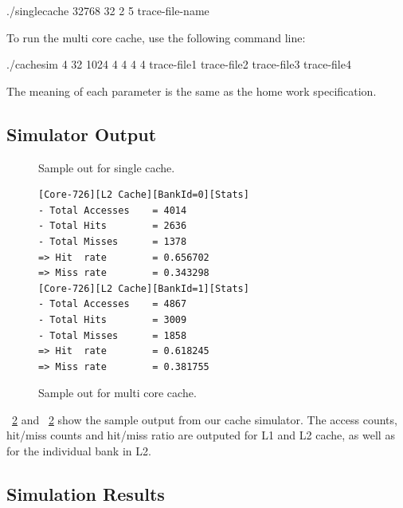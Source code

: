 \documentclass[12pt]{report}
\newcommand{\Fig}[1]{\figurename~\ref{#1}}
\begin{document}
./singlecache 32768 32 2 5 trace-file-name

To run the multi core cache, use the following command line:

./cachesim 4 32 1024 4 4 4 4 trace-file1 trace-file2 trace-file3 trace-file4

The meaning of each parameter is the same as the home work specification.

\subsection{Simulator Output}

\begin{figure}[h]

\caption{Sample out for single cache.}
\label{fig:singlecache.output}
\end{figure}

\begin{figure}[!h]
%
\begin{lstlisting}
[Core-726][L2 Cache][BankId=0][Stats]
- Total Accesses	= 4014
- Total Hits		= 2636
- Total Misses		= 1378
=> Hit  rate		= 0.656702
=> Miss rate		= 0.343298
[Core-726][L2 Cache][BankId=1][Stats]
- Total Accesses	= 4867
- Total Hits		= 3009
- Total Misses		= 1858
=> Hit  rate		= 0.618245
=> Miss rate		= 0.381755
\end{lstlisting}
\caption{Sample out for multi core cache.}
\label{fig:singlecache.output}
\end{figure}

\Fig{fig:singlecache.output} and \Fig{fig:singlecache.output} show the sample output from our cache simulator. The access counts, hit/miss counts and hit/miss ratio are outputed for L1 and L2 cache, as well as for the individual bank in L2. 

\subsection{Simulation Results}

\begin{table}[!h]
\centering  %
\caption{Simulaion results for the single cache} %
\label{sim_result1} %
\end{table}
\end{document}
